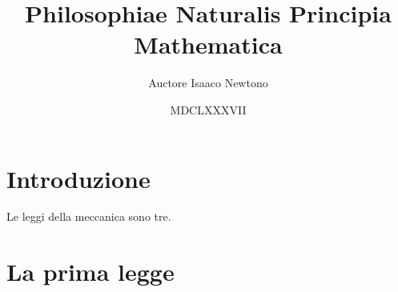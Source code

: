 \documentclass{article}
\title{Philosophiae Naturalis Principia Mathematica}
\author{Auctore Isaaco Newtono}
\date{MDCLXXXVII}
\begin{document}
\maketitle

\section{Introduzione}
Le leggi della meccanica sono tre.

\section{La prima legge}
\end{document}
